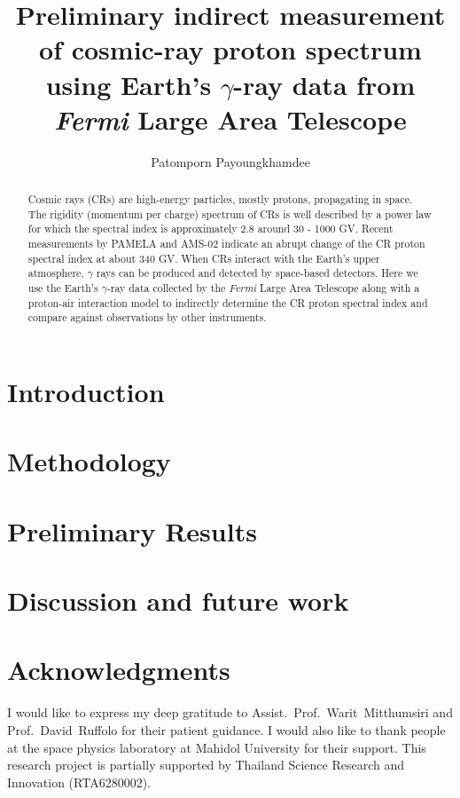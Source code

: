 \documentclass[a4paper]{jpconf}
\begin{document}
\title{Preliminary indirect measurement of cosmic-ray proton spectrum using Earth's $\gamma$-ray data from {\it Fermi} Large Area Telescope}

\author{Patomporn Payoungkhamdee}
\address{Department of Physics, Faculty of Science, Mahidol University, Bangkok 10400, Thailand}


\begin{abstract}
Cosmic rays (CRs) are high-energy particles, mostly protons, propagating in space. The rigidity (momentum per charge) spectrum of CRs is well described by a power law for which the spectral index is approximately 2.8 around 30 - 1000 GV. Recent measurements by PAMELA and AMS-02 indicate an abrupt change of the CR proton spectral index at about 340 GV. When CRs interact with the Earth's upper atmosphere, $\gamma$ rays can be produced and detected by space-based detectors. Here we use the Earth's $\gamma$-ray data collected by the {\it Fermi} Large Area Telescope along with a proton-air interaction model to indirectly determine the CR proton spectral index and compare against observations by other instruments.
\end{abstract}

\section{Introduction}


\section{Methodology}


\section{Preliminary Results}


\section{Discussion and future work}


\section*{Acknowledgments}
\par I would like to express my deep gratitude to 
Assist.~Prof.~Warit~Mitthumsiri and Prof.~David~Ruffolo for their patient guidance.
I would also like to thank people at the space physics laboratory at Mahidol University
for their support.
This research project is partially supported by Thailand Science Research
and Innovation (RTA6280002).
\end{document}
